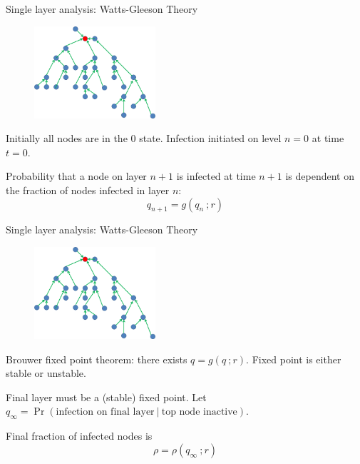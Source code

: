 \documentclass[10pt, xcolor=dvipsnames, handout]{beamer}
\begin{document}
\begin{frame}{Single layer analysis: Watts-Gleeson Theory}

\begin{figure}[htb]
\includegraphics[width=0.4\textwidth]{figures/tree.png}
\end{figure}

Initially all nodes are in the 0 state. Infection initiated on level $n=0$ at time $t=0$.

{\pause Probability that a node on layer $n+1$ is infected at time $n+1$ is dependent on the fraction of nodes infected in layer $n$:
\begin{equation}
q_{n+1} = g(q_n\ ; r)
\end{equation}
}


\end{frame}

\begin{frame}{Single layer analysis: Watts-Gleeson Theory}

\begin{figure}[htb]
\includegraphics[width=0.4\textwidth]{figures/tree.png}
\end{figure}

\pause Brouwer fixed point theorem: there exists $q = g(q\ ; r)$. Fixed point is either stable or unstable.

\pause Final layer must be a (stable) fixed point. Let $q_\infty = \Pr(\text{infection on final layer} \ | \ \text{top node inactive})$.

\pause Final fraction of infected nodes is
\begin{equation}
\rho = \rho(q_\infty\ ; r)
\end{equation}

\end{frame}
\end{document}

